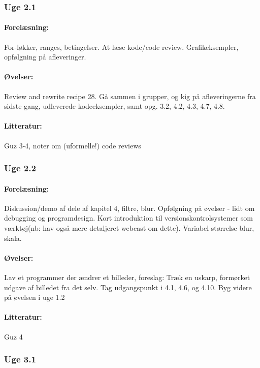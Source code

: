\documentclass[12pt]{article}
\begin{document}
\subsubsection{Uge 2.1}
\paragraph{Forelæsning:} 
For-løkker, ranges, betingelser.
At læse kode/code review. 
Grafikeksempler, opfølgning på afleveringer.

\paragraph{Øvelser:} 
Review and rewrite recipe 28.
Gå sammen i grupper, og kig på afleveringerne fra sidste gang, udleverede kodeeksempler, samt opg. 3.2, 4.2, 4.3, 4.7, 4.8.


\paragraph{Litteratur:} Guz 3-4, noter om (uformelle!) code reviews

\subsubsection{Uge 2.2}
\paragraph{Forelæsning:} 

Diskussion/demo af dele af kapitel 4, filtre, blur.
Opfølgning på øvelser -  lidt om debugging og programdesign.
Kort introduktion til versionskontrolsystemer som værktøj(nb: hav også mere detaljeret webcast om dette).
Variabel størrelse blur, skala.

\paragraph{Øvelser:}
Lav et programmer der ændrer et billeder, foreslag:
Træk en uskarp, formørket udgave af billedet fra det selv. 
Tag udgangspunkt i 4.1, 4.6, og 4.10.
Byg videre på øvelsen i uge 1.2

\paragraph{Litteratur:} Guz 4
\subsubsection{Uge 3.1}
\end{document}
